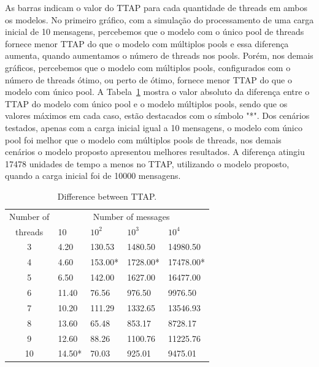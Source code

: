 As barras indicam o valor do TTAP para cada quantidade de threads em ambos os modelos. No primeiro gráfico, com a simulação do processamento de uma carga inicial de 10 mensagens, percebemos que o modelo com o único pool de threads fornece menor TTAP do que o modelo com múltiplos pools e essa diferença aumenta, quando aumentamos o número de threads nos pools. Porém, nos demais gráficos, percebemos que o modelo com múltiplos pools, configurados com o número de threads ótimo, ou perto de ótimo, fornece menor TTAP do que o modelo com único pool. A Tabela~\ref{tab:TTAP_difference} mostra o valor absoluto da diferença entre o TTAP do modelo com único pool e o modelo múltiplos pools, sendo que os valores máximos em cada caso, estão destacados com o símbolo "*". Dos cenários testados, apenas com a carga inicial igual a 10 mensagens, o modelo com único pool foi melhor que o modelo com múltiplos pools de threads, nos demais cenários o modelo proposto apresentou melhores resultados. A diferença atingiu 17478 unidades de tempo a menos no TTAP, utilizando o modelo proposto, quando a carga inicial foi de 10000 mensagens. 
%
\begin{table}[htb]
\centering
\caption{Difference between TTAP.}
\label{tab:TTAP_difference}
\begin{tabular}{cllll}
\hline
\multicolumn{1}{c}{Number of} & \multicolumn{4}{c}{Number of messages} \\
\multicolumn{1}{c}{threads}   & 10         & $10^2$       & $10^3$        & $10^4$          \\ \hline
3                             & 4.20      & 130.53       & 1480.50        & 14980.50       \\
4                             & 4.60      & 153.00*       & 1728.00*        & 17478.00*       \\
5                             & 6.50      & 142.00       & 1627.00        & 16477.00      \\
6                             & 11.40      & 76.56       & 976.50          & 9976.50      \\
7                             & 10.20      & 111.29       & 1332.65        & 13546.93       \\
8                             & 13.60      & 65.48       & 853.17         & 8728.17       \\
9                             & 12.60      & 88.26       & 1100.76        & 11225.76        \\
10                            & 14.50*     & 70.03       & 925.01        & 9475.01        \\ \hline
\end{tabular}
\end{table}  


